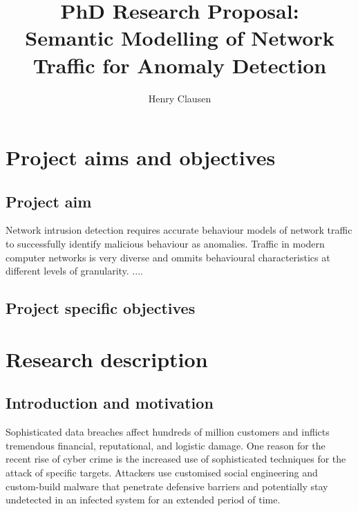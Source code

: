 \documentclass[a4paper,12pt,twoside]{report}
\makeatletter
\newcommand*{\toccontents}{\@starttoc{toc}}
\makeatother
\begin{document}
\title{\LARGE {\bf PhD Research Proposal:\\Semantic Modelling of Network Traffic for Anomaly Detection}\\
 \vspace*{-5mm}
}
\author{Henry Clausen}

\maketitle



\toccontents


\chapter{Project aims and objectives}

\section{Project aim}

Network intrusion detection requires accurate behaviour models of network traffic to successfully identify malicious behaviour as anomalies. Traffic in modern computer networks is very diverse and ommits behavioural characteristics at different levels of granularity. .... 

\section{Project specific objectives}


\chapter{Research description}

\section{Introduction and motivation}



Sophisticated data breaches affect hundreds of million customers and inflicts tremendous financial, reputational, and logistic damage. One reason for the recent rise of cyber crime is the increased use of sophisticated techniques for the attack of specific targets. Attackers use customised social engineering and custom-build malware that penetrate defensive barriers and potentially stay undetected in an infected system for an extended period of time. 
\end{document}
